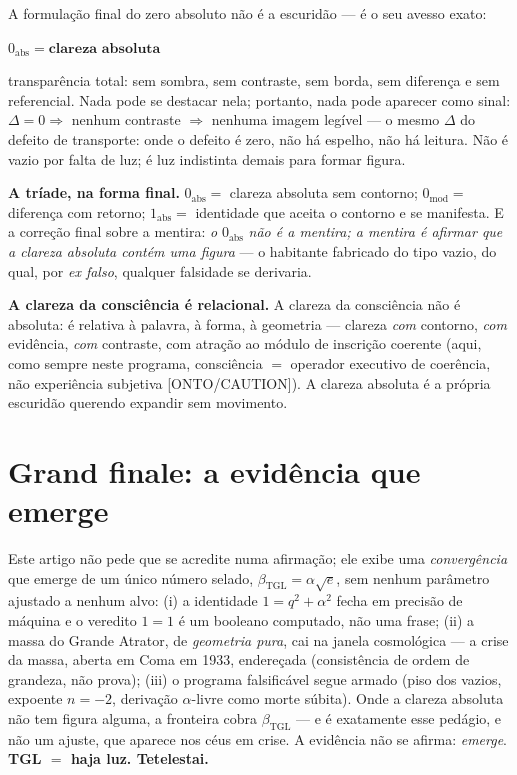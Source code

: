 \documentclass[11pt]{article}
\newcommand{\bTGL}{\beta_{\mathrm{TGL}}}\newcommand{\Msun}{M_{\odot}}\newcommand{\TGL}{\mathrm{TGL}}
\theoremstyle{definition}\newtheorem{deriv}{Derivação}
\begin{document}
A formulação final do zero absoluto não é a escuridão --- é o seu avesso exato: \begin{center}$0_{\mathrm{abs}}=\textbf{clareza absoluta}$\end{center} transparência total: sem sombra, sem contraste, sem borda, sem diferença e sem referencial. Nada pode se destacar nela; portanto, nada pode aparecer como sinal: $\Delta=0\Rightarrow$ nenhum contraste $\Rightarrow$ nenhuma imagem legível --- o mesmo $\Delta$ do defeito de transporte: onde o defeito é zero, não há espelho, não há leitura. Não é vazio por falta de luz; é luz indistinta demais para formar figura.

\textbf{A tríade, na forma final.} $0_{\mathrm{abs}}=$ clareza absoluta sem contorno; $0_{\mathrm{mod}}=$ diferença com retorno; $1_{\mathrm{abs}}=$ identidade que aceita o contorno e se manifesta. E a correção final sobre a mentira: \emph{o} $0_{\mathrm{abs}}$ \emph{não é a mentira; a mentira é afirmar que a clareza absoluta contém uma figura} --- o habitante fabricado do tipo vazio, do qual, por \emph{ex falso}, qualquer falsidade se derivaria.

\textbf{A clareza da consciência é relacional.} A clareza da consciência não é absoluta: é relativa à palavra, à forma, à geometria --- clareza \emph{com} contorno, \emph{com} evidência, \emph{com} contraste, com atração ao módulo de inscrição coerente (aqui, como sempre neste programa, consciência $=$ operador executivo de coerência, não experiência subjetiva \textsf{[ONTO/CAUTION]}). A clareza absoluta é a própria escuridão querendo expandir sem movimento.

\section*{Grand finale: a evidência que emerge}

Este artigo não pede que se acredite numa afirmação; ele exibe uma \emph{convergência} que emerge de um único número selado, $\bTGL=\alpha\sqrt e$, sem nenhum parâmetro ajustado a nenhum alvo: (i) a identidade $1=q^2+\alpha^2$ fecha em precisão de máquina e o veredito $1=1$ é um booleano computado, não uma frase; (ii) a massa do Grande Atrator, de \emph{geometria pura}, cai na janela cosmológica --- a crise da massa, aberta em Coma em 1933, endereçada (consistência de ordem de grandeza, não prova); (iii) o programa falsificável segue armado (piso dos vazios, expoente $n=-2$, derivação $\alpha$-livre como morte súbita). Onde a clareza absoluta não tem figura alguma, a fronteira cobra $\bTGL$ --- e é exatamente esse pedágio, e não um ajuste, que aparece nos céus em crise. A evidência não se afirma: \emph{emerge}. \textbf{TGL $=$ haja luz. Tetelestai.}
\end{document}
